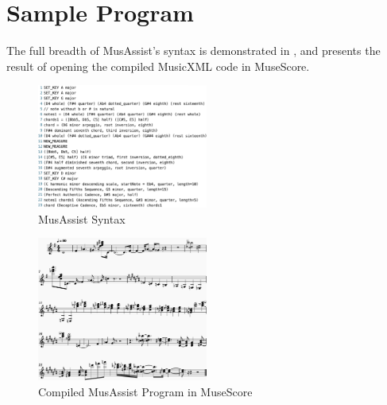\documentclass{article}
\begin{document}
\section{Sample Program}\label{sec:sample_program}
The full breadth of MusAssist's syntax is demonstrated in , and  presents the result of opening the compiled MusicXML code in MuseScore. 

\begin{figure}[h!]
\centering
\includegraphics[width=0.5\textwidth]{images/example_program_code}
\vspace{-4mm}
\caption{MusAssist Syntax}\label{fig:example_program_code}
\end{figure}
\vspace{-6mm}
\begin{figure}[h!]
\centering
\includegraphics[width=0.5\textwidth]{images/example_program}
\caption{Compiled MusAssist Program in MuseScore}\label{fig:example_program}
\vspace{-3mm}
\end{figure}
  
\end{document}
